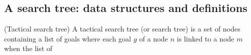 \documentclass[runningheads,a4paper,draft]{svjour3}
\begin{document}

\subsection{A search tree: data structures and definitions}



\begin{definition}(Tactical search tree)
A tactical search tree (or search tree) is a set of nodes containing a list of 
goals where each goal $g$ of a node $n$ is linked to a node $m$ when the list 
of 
\end{definition}
\end{document}
